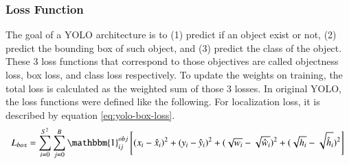 
    \subsubsection{Loss Function}
    The goal of a YOLO architecture is to (1) predict if an object exist or not, (2) predict the bounding box of such object,
    and (3) predict the class of the object. These 3 loss functions that correspond to those objectives are called 
    objectness loss, box loss, and class loss respectively. To update the weights on training, the total loss is calculated as 
    the weighted sum of those 3 losses.
    In original YOLO, the loss functions were defined like the following.
    For localization loss, it is described by equation \ref{eq:yolo-box-loss}.
    \begin{equation}
      L_{box} = \sum_{i=0}^{S^2} \sum_{j=0}^B \mathbbm{1}_{ij}^{obj} \left[(x_i - \hat{x}_i)^2 + (y_i - \hat{y}_i)^2 + (\sqrt{w_i}-\sqrt{\hat{w}_i})^2 + (\sqrt{h_i}-\sqrt{\hat{h}_i})^2\right] \\
      \label{eq:yolo-box-loss}
    \end{equation}

